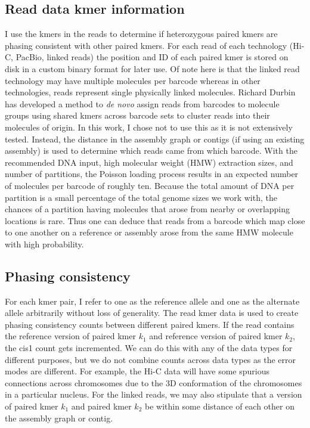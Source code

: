 \subsection{Read data kmer information}
\par{
I use the kmers in the reads to determine if heterozygous paired kmers are phasing consistent with other paired kmers. For each read of each technology (Hi-C, PacBio, linked reads) the position and ID of each paired kmer is stored on disk in a custom binary format for later use. Of note here is that the linked read technology may have multiple molecules per barcode whereas in other technologies, reads represent single physically linked molecules. Richard Durbin has developed a method to \textit{de novo} assign reads from barcodes to molecule groups using shared kmers across barcode sets to cluster reads into their molecules of origin\cite{hash10x}. In this work, I chose not to use this as it is not extensively tested. Instead, the distance in the assembly graph or contigs (if using an existing assembly) is used to determine which reads came from which barcode. With the recommended DNA input, high molecular weight (HMW) extraction sizes, and number of partitions, the Poisson loading process results in an expected number of molecules per barcode of roughly ten. Because the total amount of DNA per partition is a small percentage of the total genome sizes we work with, the chances of a partition having molecules that arose from nearby or overlapping locations is rare. Thus one can deduce that reads from a barcode which map close to one another on a reference or assembly arose from the same HMW molecule with high probability. 
}

\subsection{Phasing consistency}
\par{
For each kmer pair, I refer to one as the reference allele and one as the alternate allele arbitrarily without loss of generality. The read kmer data is used to create phasing consistency counts between different paired kmers. If the read contains the reference version of paired kmer $k_1$ and reference version of paired kmer $k_2$, the cis1 count gets incremented. We can do this with any of the data types for different purposes, but we do not combine counts across data types as the error modes are different. For example, the Hi-C data will have some spurious connections across chromosomes due to the 3D conformation of the chromosomes in a particular nucleus. For the linked reads, we may also stipulate that a version of paired kmer $k_1$ and paired kmer $k_2$ be within some distance of each other on the assembly graph or contig.
}
